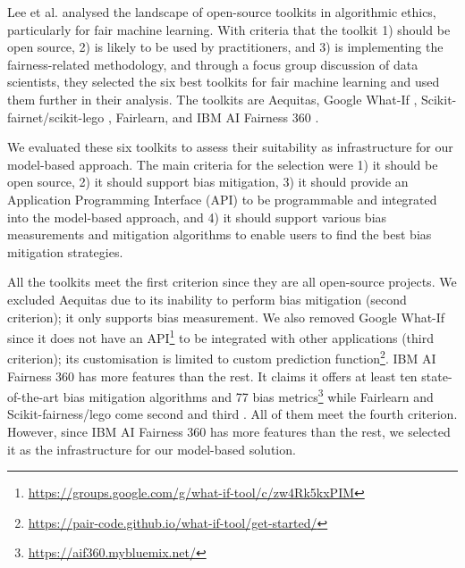 \documentclass[sigconf,review]{acmart}
\begin{document}
{		Lee et al. \cite{lee2021landscape} analysed the landscape of open-source toolkits in algorithmic ethics, particularly for fair machine learning. With criteria that the toolkit 1) should be open source, 2) is likely to be used by practitioners, and 3) is implementing the fairness-related methodology, and through a focus group discussion of data scientists, they selected the six best toolkits for fair machine learning and used them further in their analysis. The toolkits are Aequitas\cite{saleiro2019aequitas}, Google What-If \cite{googlewhatif2020}, Scikit-fairnet/scikit-lego \cite{scikitfairness2022,scikitlego2022}, Fairlearn\cite{bird2020fairlearn}, and IBM AI Fairness 360 \cite{bellamy2018ai}.  
		
		We evaluated these six toolkits to assess their suitability as infrastructure for our model-based approach. The main criteria for the selection were 1) it should be open source, 2) it should support bias mitigation, 3) it should provide an Application Programming Interface (API) to be programmable and integrated into the model-based approach, and 4) it should support various bias measurements and mitigation algorithms to enable users to find the best bias mitigation strategies. 
		
		All the toolkits meet the first criterion since they are all open-source projects. We excluded Aequitas due to its inability to perform bias mitigation (second criterion); it only supports bias measurement. We also removed Google What-If since it does not have an API\footnote{\url{https://groups.google.com/g/what-if-tool/c/zw4Rk5kxPIM}} to be integrated with other applications (third criterion); its customisation is limited to custom prediction function\footnote{\url{https://pair-code.github.io/what-if-tool/get-started/}}. IBM AI Fairness 360 has more features than the rest. It claims it offers at least ten state-of-the-art bias mitigation algorithms and 77 bias metrics\footnote{\url{https://aif360.mybluemix.net/}} while Fairlearn and Scikit-fairness/lego come second and third \cite{lee2021landscape}. All of them meet the fourth criterion. However, since IBM AI Fairness 360 has more features than the rest, we selected it as the infrastructure for our model-based solution.
		
		
		
}
\end{document}
